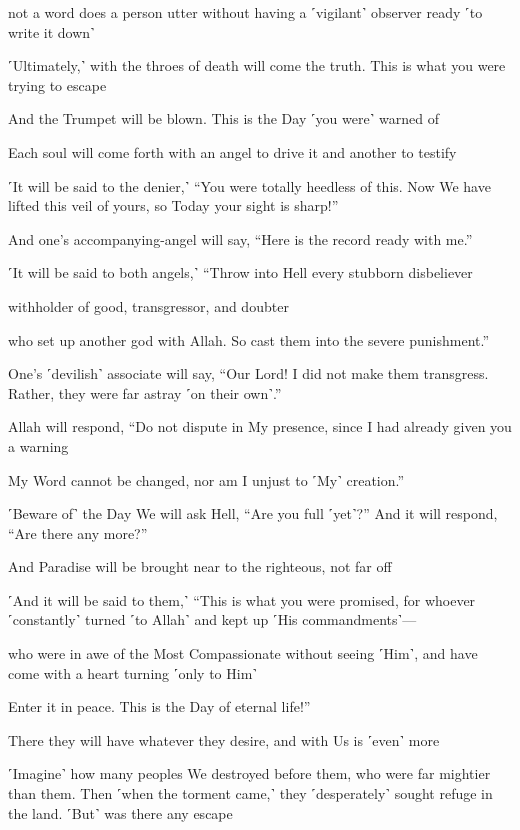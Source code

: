not a word does a person utter without having a ˹vigilant˺ observer ready ˹to write it down˺

˹Ultimately,˺ with the throes of death will come the truth. This is what you were trying to escape

And the Trumpet will be blown. This is the Day ˹you were˺ warned of

Each soul will come forth with an angel to drive it and another to testify

˹It will be said to the denier,˺ “You were totally heedless of this. Now We have lifted this veil of yours, so Today your sight is sharp!”

And one’s accompanying-angel will say, “Here is the record ready with me.”

˹It will be said to both angels,˺ “Throw into Hell every stubborn disbeliever

withholder of good, transgressor, and doubter

who set up another god with Allah. So cast them into the severe punishment.”

One’s ˹devilish˺ associate will say, “Our Lord! I did not make them transgress. Rather, they were far astray ˹on their own˺.”

Allah will respond, “Do not dispute in My presence, since I had already given you a warning

My Word cannot be changed, nor am I unjust to ˹My˺ creation.”

˹Beware of˺ the Day We will ask Hell, “Are you full ˹yet˺?” And it will respond, “Are there any more?”

And Paradise will be brought near to the righteous, not far off

˹And it will be said to them,˺ “This is what you were promised, for whoever ˹constantly˺ turned ˹to Allah˺ and kept up ˹His commandments˺—

who were in awe of the Most Compassionate without seeing ˹Him˺, and have come with a heart turning ˹only to Him˺

Enter it in peace. This is the Day of eternal life!”

There they will have whatever they desire, and with Us is ˹even˺ more

˹Imagine˺ how many peoples We destroyed before them, who were far mightier than them. Then ˹when the torment came,˺ they ˹desperately˺ sought refuge in the land. ˹But˺ was there any escape

